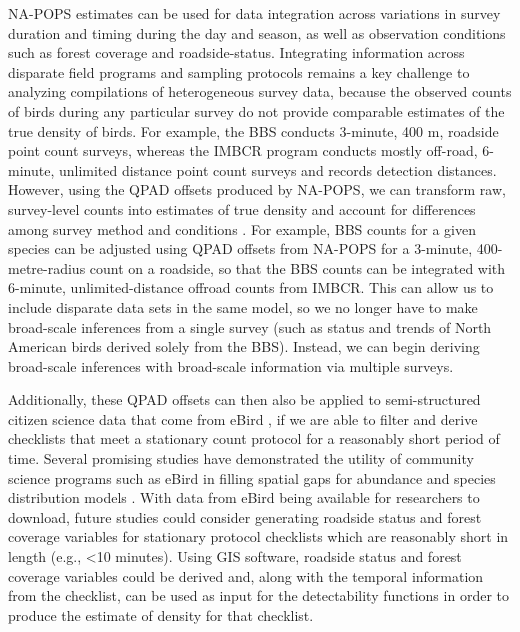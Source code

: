 \par NA-POPS estimates can be used for data integration across variations in survey duration and timing during the day and season, as well as observation conditions such as forest coverage and roadside-status.
Integrating information across disparate field programs and sampling protocols remains a key challenge to analyzing compilations of heterogeneous survey data, because the observed counts of birds during any particular survey do not provide comparable estimates of the true density of birds.
For example, the BBS conducts 3-minute, 400 m, roadside point count surveys, whereas the IMBCR program conducts mostly off-road, 6-minute, unlimited distance point count surveys and records detection distances.
However, using the QPAD offsets produced by NA-POPS, we can transform raw, survey-level counts into estimates of true density and account for differences among survey method and conditions \citep{stralberg_projecting_2015, solymos_lessons_2020}.
For example, BBS counts for a given species can be adjusted using QPAD offsets from NA-POPS for a 3-minute, 400-metre-radius count on a roadside, so that the BBS counts can be integrated with 6-minute, unlimited-distance offroad counts from IMBCR.
This can allow us to include disparate data sets in the same model, so we no longer have to make broad-scale inferences from a single survey (such as status and trends of North American birds derived solely from the BBS). Instead, we can begin deriving broad-scale inferences with broad-scale information via multiple surveys. 

\par Additionally, these QPAD offsets can then also be applied to semi-structured citizen science data that come from eBird \citep{sullivan_ebird_2014}, if we are able to filter and derive checklists that meet a stationary count protocol for a reasonably short period of time.
Several promising studies have demonstrated the utility of community science programs such as eBird in filling spatial gaps for abundance and species distribution models \citep{pacifici_integrating_2017, robinson_integrating_2020, joseph_data_2021}.
With data from eBird being available for researchers to download, future studies could consider generating roadside status and forest coverage variables for stationary protocol checklists which are reasonably short in length (e.g., <10 minutes).
Using GIS software, roadside status and forest coverage variables could be derived and, along with the temporal information from the checklist, can be used as input for the detectability functions in order to produce the estimate of density for that checklist. 


